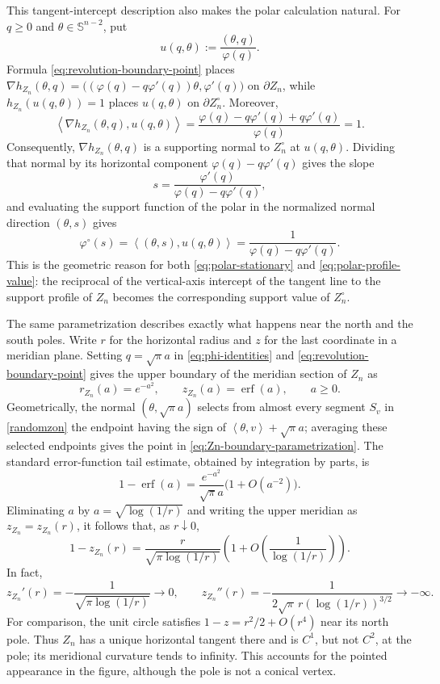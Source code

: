 \documentclass[11pt]{article}
\theoremstyle{definition}
\theoremstyle{remark}
\newcommand{\Sph}{\mathbb S}
\newcommand{\ip}[2]{\left\langle #1,#2\right\rangle}
\newcommand{\erf}{\operatorname{erf}}
\begin{document}
This tangent-intercept description also makes the polar calculation
natural.  For $q\geq0$ and $\theta\in\Sph^{n-2}$, put
\[
 u(q,\theta):=\frac{(\theta,q)}{\varphi(q)}.
\]
Formula \eqref{eq:revolution-boundary-point} places $
 \nabla h_{Z_n}(\theta,q)
 =\bigl((\varphi(q)-q\varphi'(q))\theta,\varphi'(q)\bigr)
$
on $\partial Z_n$, while $h_{Z_n}(u(q,\theta))=1$ places
$u(q,\theta)$ on $\partial Z_n^\circ$.  Moreover,
\[
 \ip{\nabla h_{Z_n}(\theta,q)}{u(q,\theta)}
 =\frac{\varphi(q)-q\varphi'(q)+q\varphi'(q)}{\varphi(q)}=1.
\]
Consequently, $\nabla h_{Z_n}(\theta,q)$ is a supporting normal to
$Z_n^\circ$ at $u(q,\theta)$.  Dividing that normal by its horizontal
component $\varphi(q)-q\varphi'(q)$ gives the slope
\[
 s=\frac{\varphi'(q)}{\varphi(q)-q\varphi'(q)},
\]
and evaluating the support function of the polar in the normalized
normal direction $(\theta,s)$ gives
\[
 \varphi^\circ(s)
 =\ip{(\theta,s)}{u(q,\theta)}
 =\frac1{\varphi(q)-q\varphi'(q)}.
\]
This is the geometric reason for both
\eqref{eq:polar-stationary} and \eqref{eq:polar-profile-value}: the reciprocal of the vertical-axis intercept of the tangent line to
the support profile of $Z_n$ becomes the corresponding support value
of $Z_n^\circ$.

The same parametrization describes exactly what happens near the north and the south
poles.  Write $r$ for the horizontal radius and $z$ for the last
coordinate in a meridian plane.  Setting $q=\sqrt\pi a$ in
\eqref{eq:phi-identities} and
\eqref{eq:revolution-boundary-point} gives the upper
boundary of the meridian section of $Z_n$ as
\begin{equation}\label{eq:Zn-boundary-parametrization}
 r_{Z_n}(a)=e^{-a^2},\qquad z_{Z_n}(a)=\erf(a),\qquad a\geq0.
\end{equation}
Geometrically, the normal $(\theta,\sqrt\pi a)$ selects from almost every
segment $S_v$ in \eqref{randomzon}  the endpoint having the sign of $\ip{\theta}{v}+\sqrt\pi a$; averaging these selected endpoints gives
the point in \eqref{eq:Zn-boundary-parametrization}.  The standard
error-function tail estimate, obtained by integration by parts, is
\[
 1-\erf(a)
 =\frac{e^{-a^2}}{\sqrt\pi a}
  \bigl(1+O(a^{-2})\bigr).
\]
Eliminating $a$ by
$a=\sqrt{\log(1/r)}$ and writing the upper meridian as
$z_{Z_n}=z_{Z_n}(r)$, it follows that, as $r\downarrow0$,
\begin{equation}\label{eq:Zn-pole-asymptotic}
 1-z_{Z_n}(r)
 =\frac{r}{\sqrt{\pi\log(1/r)}}
  \left(1+O\!\left(\frac1{\log(1/r)}\right)\right).
\end{equation}
In fact,
\[
 z_{Z_n}'(r)=-\frac1{\sqrt{\pi\log(1/r)}}\longrightarrow0,
 \qquad
 z_{Z_n}''(r)
 =-\frac1{2\sqrt\pi\,r(\log(1/r))^{3/2}}
 \longrightarrow-\infty.
\]
For comparison, the unit circle satisfies
$1-z=r^2/2+O(r^4)$ near its north pole.  Thus $Z_n$ has a unique
horizontal tangent there and is $C^1$, but not $C^2$, at the pole; its
meridional curvature tends to infinity.  This accounts for the pointed
appearance in the figure, although the pole is not a conical vertex.
\end{document}

